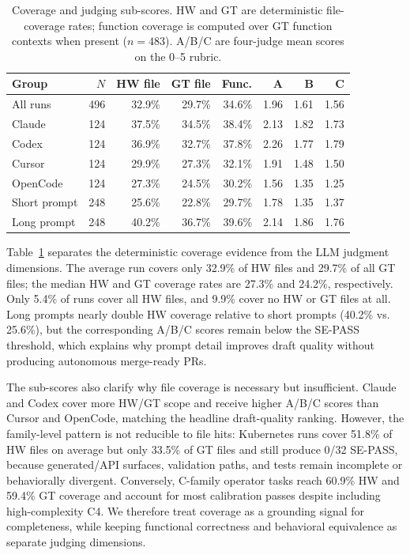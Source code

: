 
\begin{table}[t]
\caption{Coverage and judging sub-scores. HW and GT are deterministic file-coverage rates; function coverage is computed over GT function contexts when present ($n{=}483$). A/B/C are four-judge mean scores on the 0--5 rubric.}
\label{tab:coverage-subscores}
\centering
\small
\begin{tabular*}{\textwidth}{@{\extracolsep{\fill}}lrrrrrrr@{}}
\toprule
\textbf{Group} & $N$ & \textbf{HW file} & \textbf{GT file} & \textbf{Func.} & \textbf{A} & \textbf{B} & \textbf{C} \\
\midrule
All runs & 496 & 32.9\% & 29.7\% & 34.6\% & 1.96 & 1.61 & 1.56 \\
\midrule
Claude   & 124 & 37.5\% & 34.5\% & 38.4\% & 2.13 & 1.82 & 1.73 \\
Codex    & 124 & 36.9\% & 32.7\% & 37.8\% & 2.26 & 1.77 & 1.79 \\
Cursor   & 124 & 29.9\% & 27.3\% & 32.1\% & 1.91 & 1.48 & 1.50 \\
OpenCode & 124 & 27.3\% & 24.5\% & 30.2\% & 1.56 & 1.35 & 1.25 \\
\midrule
Short prompt & 248 & 25.6\% & 22.8\% & 29.7\% & 1.78 & 1.35 & 1.37 \\
Long prompt  & 248 & 40.2\% & 36.7\% & 39.6\% & 2.14 & 1.86 & 1.76 \\
\bottomrule
\end{tabular*}
\end{table}

Table~\ref{tab:coverage-subscores} separates the deterministic coverage evidence from the LLM judgment dimensions. The average run covers only 32.9\% of HW files and 29.7\% of all GT files; the median HW and GT coverage rates are 27.3\% and 24.2\%, respectively. Only 5.4\% of runs cover all HW files, and 9.9\% cover no HW or GT files at all. Long prompts nearly double HW coverage relative to short prompts (40.2\% vs. 25.6\%), but the corresponding A/B/C scores remain below the SE-PASS threshold, which explains why prompt detail improves draft quality without producing autonomous merge-ready PRs.

The sub-scores also clarify why file coverage is necessary but insufficient. Claude and Codex cover more HW/GT scope and receive higher A/B/C scores than Cursor and OpenCode, matching the headline draft-quality ranking. However, the family-level pattern is not reducible to file hits: Kubernetes runs cover 51.8\% of HW files on average but only 33.5\% of GT files and still produce 0/32 SE-PASS, because generated/API surfaces, validation paths, and tests remain incomplete or behaviorally divergent. Conversely, C-family operator tasks reach 60.9\% HW and 59.4\% GT coverage and account for most calibration passes despite including high-complexity C4. We therefore treat coverage as a grounding signal for completeness, while keeping functional correctness and behavioral equivalence as separate judging dimensions.

